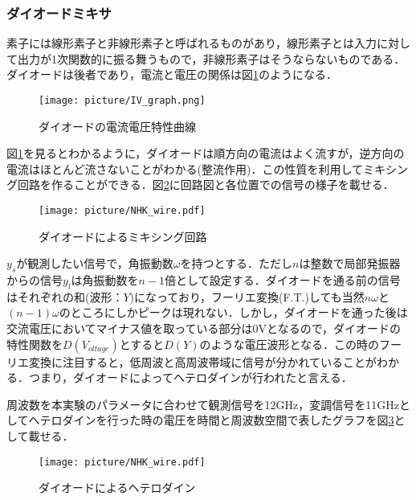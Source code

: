 \documentclass[a4j,10pt,oneside,openany]{jsbook}
\begin{document}
{\subsubsection{ダイオードミキサ}
素子には線形素子と非線形素子と呼ばれるものがあり，線形素子とは入力に対して出力が1次関数的に振る舞うもので，非線形素子はそうならないものである．ダイオードは後者であり，電流と電圧の関係は図\ref{fig:IV_graph}のようになる．
\begin{figure}[htbp]
  \begin{center}
    \texttt{[image: picture/IV\_graph.png]}
    \caption{ダイオードの電流電圧特性曲線\cite{pic3}}
    \label{fig:IV_graph}
  \end{center}
\end{figure}
図\ref{fig:IV_graph}を見るとわかるように，ダイオードは順方向の電流はよく流すが，逆方向の電流はほとんど流さないことがわかる(整流作用)．この性質を利用してミキシング回路を作ることができる．図\ref{fig:hetero_wire}に回路図と各位置での信号の様子を載せる．
\begin{figure}[htbp]
  \begin{center}
    \texttt{[image: picture/NHK\_wire.pdf]}
    \caption{ダイオードによるミキシング回路}
    \label{fig:hetero_wire}
  \end{center}
\end{figure}

$y_s$が観測したい信号で，角振動数$\omega$を持つとする．ただし$n$は整数で局部発振器からの信号$y_l$は角振動数を$n-1$倍として設定する．ダイオードを通る前の信号はそれぞれの和(波形：$Y$)になっており，フーリエ変換(F.T.)しても当然$n\omega$と$(n-1)\omega$のところにしかピークは現れない．しかし，ダイオードを通った後は交流電圧においてマイナス値を取っている部分は0Vとなるので，ダイオードの特性関数を$D(V_{oltage})$とすると$D(Y)$のような電圧波形となる．この時のフーリエ変換に注目すると，低周波と高周波帯域に信号が分かれていることがわかる．つまり，ダイオードによってヘテロダインが行われたと言える．

周波数を本実験のパラメータに合わせて観測信号を12GHz，変調信号を11GHzとしてヘテロダインを行った時の電圧を時間と周波数空間で表したグラフを図\ref{fig:hetero}として載せる．
\begin{figure}[htbp]
  \begin{center}
    \texttt{[image: picture/NHK\_wire.pdf]}
    \caption{ダイオードによるヘテロダイン}
    \label{fig:hetero}
  \end{center}
\end{figure}

}
\end{document}
